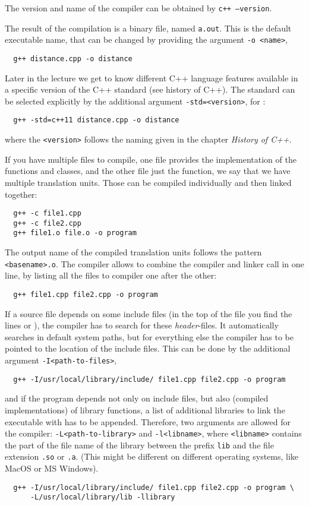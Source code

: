 \begin{rem}
  The version and name of the compiler can be obtained by \texttt{c++ --version}.
\end{rem}

The result of the compilation is a binary file, named \texttt{a.out}. This is the default executable name, that can be changed by providing the argument \texttt{-o <name>}, \eg
%
\begin{verbatim}
  g++ distance.cpp -o distance
\end{verbatim}
%
Later in the lecture we get to know different C++ language features available in a specific version of the C++ standard (see history of C++). The standard can be selected explicitly by the additional argument \texttt{-std=<version>}, \eg for :
%
\begin{verbatim}
  g++ -std=c++11 distance.cpp -o distance
\end{verbatim}
%
where the \texttt{<version>} follows the naming given in the chapter \emph{History of C++}.

If you have multiple files to compile, \eg one file provides the implementation of the functions and classes, and the other file just the  function, we say that we have multiple translation units. Those can be compiled individually and then linked together:
%
\begin{verbatim}
  g++ -c file1.cpp
  g++ -c file2.cpp
  g++ file1.o file.o -o program
\end{verbatim}
%
The output name of the compiled translation units follows the pattern \texttt{<basename>.o}. The compiler allows to combine the compiler and linker call in one line, by listing all the files to compiler one after the other:
%
\begin{verbatim}
  g++ file1.cpp file2.cpp -o program
\end{verbatim}

If a source file depends on some include files (in the top of the file you find the lines  or ), the compiler has to search for these \textit{header}-files. It automatically searches in default system paths, but for everything else the compiler has to be pointed to the location of the include files. This can be done by the additional argument \texttt{-I<path-to-files>}, \eg
%
\begin{verbatim}
  g++ -I/usr/local/library/include/ file1.cpp file2.cpp -o program
\end{verbatim}
%
and if the program depends not only on include files, but also  (compiled implementations) of library functions, a list of additional libraries to link the executable with has to be appended. Therefore, two arguments are allowed for the compiler: \texttt{-L<path-to-library>} and \texttt{-l<libname>}, where \texttt{<libname>} contains the part of the file name of the library between the prefix \texttt{lib} and the file extension \texttt{.so} or \texttt{.a}. (This might be different on different operating systems, like MacOS or MS Windows).
%
\begin{verbatim}
  g++ -I/usr/local/library/include/ file1.cpp file2.cpp -o program \
      -L/usr/local/library/lib -llibrary
\end{verbatim}
%

